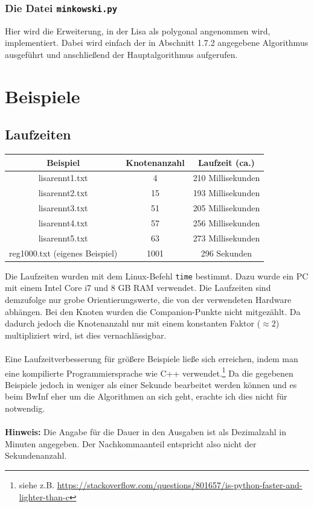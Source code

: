 \documentclass[a4paper, notitlepage, 12pt]{scrartcl}
\begin{document}
\subsubsection{Die Datei \texttt{minkowski.py}}
Hier wird die Erweiterung, in der Lisa als polygonal angenommen wird, implementiert. Dabei wird einfach der in Abschnitt 1.7.2 angegebene Algorithmus ausgeführt und anschließend der Hauptalgorithmus aufgerufen.
\section{Beispiele}
\subsection*{Laufzeiten}
 \begin{table}[H]
	\begin{tabular}{|c|c|c|} 
		\hline
		Beispiel                                      & Knotenanzahl & Laufzeit (ca.)       \\ \hline \hline
		lisarennt1.txt                              & 4     & 210 Millisekunden    \\
		lisarennt2.txt                              & 15      & 193 Millisekunden     \\
		lisarennt3.txt                              & 51      & 205 Millisekunden     \\
		lisarennt4.txt                              & 57      & 256 Millisekunden    \\
		lisarennt5.txt                              & 63      & 273 Millisekunden    \\
		reg1000.txt (eigenes Beispiel)				& 1001    & 296 Sekunden \\ \hline
	\end{tabular}
\end{table}
Die Laufzeiten wurden mit dem Linux-Befehl \texttt{time} bestimmt. Dazu wurde ein PC mit einem Intel Core i7 und 8 GB RAM verwendet. Die Laufzeiten sind demzufolge nur grobe Orientierungswerte, die von der verwendeten Hardware abhängen. Bei den Knoten wurden die Companion-Punkte nicht mitgezählt. Da dadurch jedoch die Knotenanzahl nur mit einem konstanten Faktor ($\approx 2$) multipliziert wird, ist dies vernachlässigbar. \\ \\
Eine Laufzeitverbesserung für größere Beispiele ließe sich erreichen, indem man eine kompilierte Programmiersprache wie C++ verwendet.\footnote{siehe z.B. \url{https://stackoverflow.com/questions/801657/is-python-faster-and-lighter-than-c}} Da die gegebenen Beispiele jedoch in weniger als einer Sekunde bearbeitet werden können und es beim BwInf eher um die Algorithmen an sich geht, erachte ich dies nicht für notwendig. \\ \\
\textbf{Hinweis:} Die Angabe für die Dauer in den Ausgaben ist als Dezimalzahl in Minuten angegeben. Der Nachkommaanteil entspricht also nicht der Sekundenanzahl.
\end{document}
